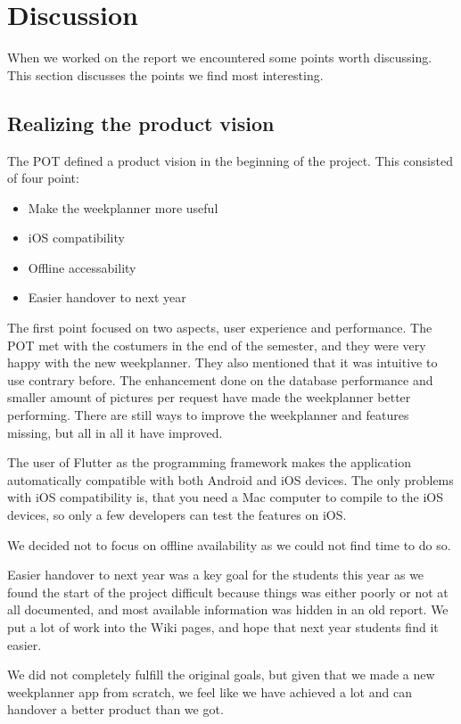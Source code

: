 \section{Discussion}

When we worked on the report we encountered some points worth discussing. This section discusses the points we find most interesting. 

\subsection{Realizing the product vision}
The \gls{POT} defined a product vision in the beginning of the project. This consisted of four point:
\begin{itemize}
    \item Make the weekplanner more useful
    \item iOS compatibility
    \item Offline accessability
    \item Easier handover to next year
\end{itemize}
The first point focused on two aspects, user experience and performance. The \gls{POT} met with the costumers in the end of the semester, and they were very happy with the new weekplanner. They also mentioned that it was intuitive to use contrary before. The enhancement done on the database performance and smaller amount of pictures per request have made the weekplanner better performing. There are still ways to improve the weekplanner and features missing, but all in all it have improved.

The user of Flutter as the programming framework makes the application automatically compatible with both Android and iOS devices. The only problems with iOS compatibility is, that you need a Mac computer to compile to the iOS devices, so only a few developers can test the features on iOS. 

We decided not to focus on offline availability as we could not find time to do so.

Easier handover to next year was a key goal for the students this year as we found the start of the project difficult because things was either poorly or not at all documented, and most available information was hidden in an old report. We put a lot of work into the Wiki pages, and hope that next year students find it easier.

We did not completely fulfill the original goals, but given that we made a new weekplanner app from scratch, we feel like we have achieved a lot and can handover a better product than we got.

